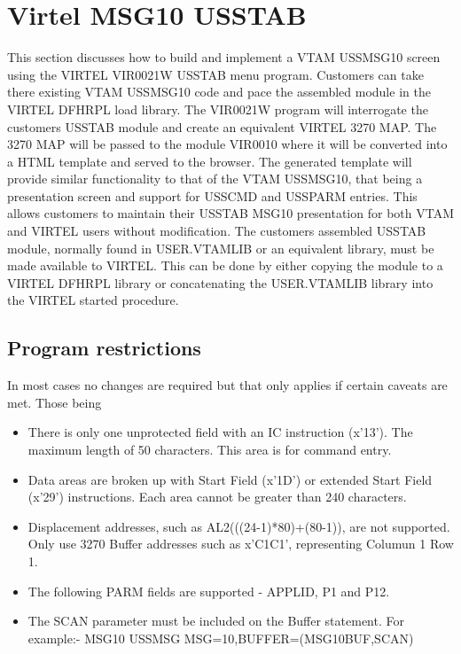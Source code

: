 \documentclass[letterpaper,10pt,english]{sphinxmanual}
\begin{document}
\chapter{Virtel MSG10 USSTAB}
\label{\detokenize{Customization:virtel-msg10-usstab}}\label{\detokenize{Customization:index-128}}
This section discusses how to build and implement a VTAM USSMSG10 screen using the VIRTEL VIR0021W USSTAB menu program. Customers can take there existing VTAM USSMSG10 code and pace the assembled module in the VIRTEL DFHRPL load library. The VIR0021W program will interrogate the customers USSTAB module and create an equivalent VIRTEL 3270 MAP. The 3270 MAP will be passed to the module VIR0010 where it will be converted into a HTML template and served to the browser. The generated template will provide similar functionality to that of the VTAM USSMSG10, that being a presentation screen and support for USSCMD and USSPARM entries. This allows customers to maintain their USSTAB MSG10 presentation for both VTAM and VIRTEL users without modification. The customers assembled USSTAB module, normally found in USER.VTAMLIB or an equivalent library, must be made available to VIRTEL. This can be done by either copying the module to a VIRTEL DFHRPL library or concatenating the USER.VTAMLIB library into the VIRTEL started procedure.


\section{Program restrictions}
\label{\detokenize{Customization:program-restrictions}}
In most cases no changes are required but that only applies if certain caveats are met. Those being
\begin{itemize}
\item {} 
There is only one unprotected field with an IC instruction (x’13’). The maximum length of 50 characters. This area is for command entry.

\item {} 
Data areas are broken up with Start Field (x’1D’) or extended Start Field (x’29’) instructions. Each area cannot be greater than 240 characters.

\item {} 
Displacement addresses, such as AL2(((24-1)*80)+(80-1)), are not supported. Only use 3270 Buffer addresses such as x’C1C1’, representing Columun 1 Row 1.

\item {} 
The following PARM fields are supported - APPLID, P1 and P12.

\item {} 
The SCAN parameter must be included on the Buffer statement. For example:- MSG10 USSMSG MSG=10,BUFFER=(MSG10BUF,SCAN)

\end{itemize}
\end{document}
